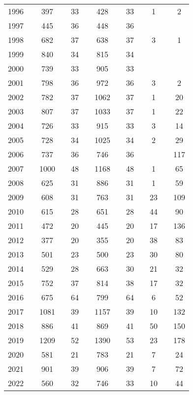 \begin{table}[]
\begin{tabular}{rlclccccccccc}
1996 &  & 397 &  & 33 &  & 428 &  & 33 &  & 1 &  & 2 \\
1997 &  & 445 &  & 36 &  & 448 &  & 36 &  &  &  &  \\
1998 &  & 682 &  & 37 &  & 638 &  & 37 &  & 3 &  & 1 \\
1999 &  & 840 &  & 34 &  & 815 &  & 34 &  &  &  &  \\
2000 &  & 739 &  & 33 &  & 905 &  & 33 &  &  &  &  \\
2001 &  & 798 &  & 36 &  & 972 &  & 36 &  & 3 &  & 2 \\
2002 &  & 782 &  & 37 &  & 1062 &  & 37 &  & 1 &  & 20 \\
2003 &  & 807 &  & 37 &  & 1033 &  & 37 &  & 1 &  & 22 \\
2004 &  & 726 &  & 33 &  & 915 &  & 33 &  & 3 &  & 14 \\
2005 &  & 728 &  & 34 &  & 1025 &  & 34 &  & 2 &  & 29 \\
2006 &  & 737 &  & 36 &  & 746 &  & 36 &  &  &  & 117 \\
2007 &  & 1000 &  & 48 &  & 1168 &  & 48 &  & 1 &  & 65 \\
2008 &  & 625 &  & 31 &  & 886 &  & 31 &  & 1 &  & 59 \\
2009 &  & 608 &  & 31 &  & 763 &  & 31 &  & 23 &  & 109 \\
2010 &  & 615 &  & 28 &  & 651 &  & 28 &  & 44 &  & 90 \\
2011 &  & 472 &  & 20 &  & 445 &  & 20 &  & 17 &  & 136 \\
2012 &  & 377 &  & 20 &  & 355 &  & 20 &  & 38 &  & 83 \\
2013 &  & 501 &  & 23 &  & 500 &  & 23 &  & 30 &  & 80 \\
2014 &  & 529 &  & 28 &  & 663 &  & 30 &  & 21 &  & 32 \\
2015 &  & 752 &  & 37 &  & 814 &  & 38 &  & 17 &  & 32 \\
2016 &  & 675 &  & 64 &  & 799 &  & 64 &  & 6 &  & 52 \\
2017 &  & 1081 &  & 39 &  & 1157 &  & 39 &  & 10 &  & 132 \\
2018 &  & 886 &  & 41 &  & 869 &  & 41 &  & 50 &  & 150 \\
2019 &  & 1209 &  & 52 &  & 1390 &  & 53 &  & 23 &  & 178 \\
2020 &  & 581 &  & 21 &  & 783 &  & 21 &  & 7 &  & 24 \\
2021 &  & 901 &  & 39 &  & 906 &  & 39 &  & 7 &  & 72 \\
2022 &  & 560 &  & 32 &  & 746 &  & 33 &  & 10 &  & 44 \\ \hline
\end{tabular}
\end{table}
\endgroup{}
\endgroup{}
